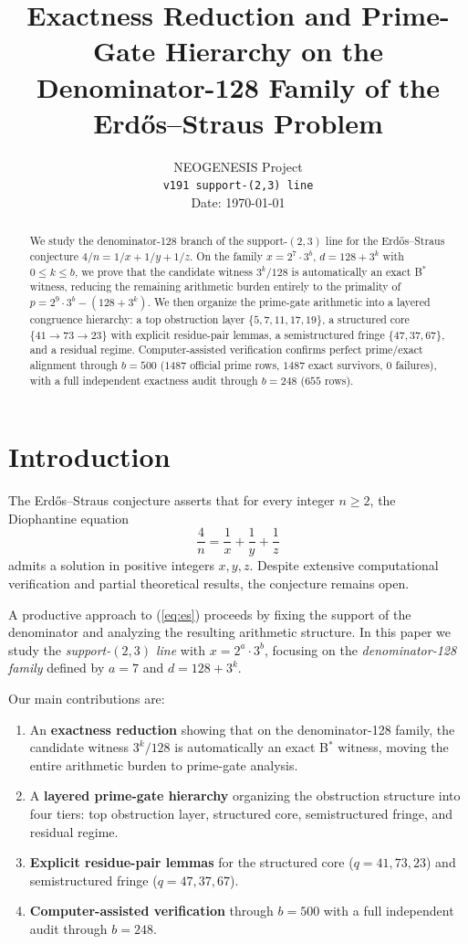 \documentclass[11pt,letterpaper]{article}
\title{Exactness Reduction and Prime-Gate Hierarchy on the Denominator-128 Family of the Erd\H{o}s--Straus Problem}
\author{NEOGENESIS Project\\
\texttt{v191 support-(2,3) line} \\
\small Date: \today}
\date{}
\begin{document}
\maketitle

\begin{abstract}
We study the denominator-128 branch of the support-$(2,3)$ line for the Erd\H{o}s--Straus conjecture
$4/n = 1/x + 1/y + 1/z$.
On the family $x = 2^7 \cdot 3^b$, $d = 128 + 3^k$ with $0 \leq k \leq b$, we prove that the candidate witness $3^k/128$ is automatically an exact B$^\ast$ witness, reducing the remaining arithmetic burden entirely to the primality of $p = 2^9 \cdot 3^b - (128 + 3^k)$.
We then organize the prime-gate arithmetic into a layered congruence hierarchy: a top obstruction layer $\{5,7,11,17,19\}$, a structured core $\{41 \to 73 \to 23\}$ with explicit residue-pair lemmas, a semistructured fringe $\{47,37,67\}$, and a residual regime.
Computer-assisted verification confirms perfect prime/exact alignment through $b = 500$ ($1487$ official prime rows, $1487$ exact survivors, $0$ failures), with a full independent exactness audit through $b = 248$ ($655$ rows).
\end{abstract}

\tableofcontents

\section{Introduction}

The Erd\H{o}s--Straus conjecture asserts that for every integer $n \geq 2$, the Diophantine equation
\begin{equation}\label{eq:es}
\frac{4}{n} = \frac{1}{x} + \frac{1}{y} + \frac{1}{z}
\end{equation}
admits a solution in positive integers $x, y, z$.
Despite extensive computational verification and partial theoretical results, the conjecture remains open.

A productive approach to (\ref{eq:es}) proceeds by fixing the support of the denominator and analyzing the resulting arithmetic structure.
In this paper we study the \emph{support-$(2,3)$ line} with $x = 2^a \cdot 3^b$, focusing on the \emph{denominator-128 family} defined by $a = 7$ and $d = 128 + 3^k$.

Our main contributions are:
\begin{enumerate}[leftmargin=*]
    \item An \textbf{exactness reduction} showing that on the denominator-128 family, the candidate witness $3^k/128$ is automatically an exact B$^\ast$ witness, moving the entire arithmetic burden to prime-gate analysis.
    \item A \textbf{layered prime-gate hierarchy} organizing the obstruction structure into four tiers: top obstruction layer, structured core, semistructured fringe, and residual regime.
    \item \textbf{Explicit residue-pair lemmas} for the structured core ($q = 41, 73, 23$) and semistructured fringe ($q = 47, 37, 67$).
    \item \textbf{Computer-assisted verification} through $b = 500$ with a full independent audit through $b = 248$.
\end{enumerate}
\end{document}
